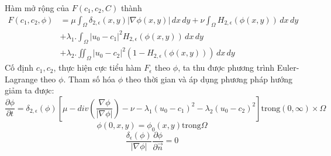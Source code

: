 \documentclass[12pt,oneside,a4]{report}
\begin{document}
 Hàm mở rộng của $F(c_1,c_2,C)$ thành
\begin{equation}
\begin{split}
F(c_1, c_2, \phi)&=\mu \int_{\Omega}\delta_{2,\epsilon}(x,y)|\nabla \phi(x,y)|\,dx\,dy+\nu  \int_{\Omega}H_{2,\epsilon}( \phi(x,y))\,dx\,dy \\ 
&+\lambda_1 .\int_{\Omega} |u_0-c_1|^2H_{2,\epsilon}(\phi(x,y)) \,dx\,dy\\&+\lambda_2 .\iint_{\Omega} |u_0-c_2|^2(1-H_{2,\epsilon}(\phi(x,y))) \,dx\,dy
\end{split}
\end{equation}
Cố định $c_1, c_2$, thực hiện cực tiểu hàm $F_{\epsilon}$ theo $\phi$, ta thu được phương trình Euler-Lagrange theo $\phi$. Tham số hóa $\phi$ theo thời gian và áp dụng phương pháp hướng giảm ta được:
\begin{equation}
\dfrac{\partial \phi}{\partial t}= \delta_{2,\epsilon}(\phi)[\mu- div(\dfrac{\nabla \phi}{|\nabla \phi|})- \nu- \lambda_1 (u_0-c_1)^2-\lambda_2 (u_0-c_2)^2]  \text{trong} (0,\infty)\times \Omega
\end{equation}
\begin{equation}
\phi(0,x,y)=\phi_0(x,y) \text{trong} \Omega 
\end{equation}
\begin{equation}
\dfrac{\delta_{\epsilon}(\phi)}{|\nabla \phi|}\dfrac{\partial \phi}{\partial \vec{n}}=0
\end{equation}
\end{document}
